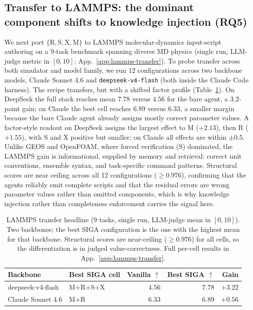 \documentclass{article}
\begin{document}
\subsection{Transfer to LAMMPS: the dominant component shifts to knowledge injection (RQ5)}
\label{subsec:lammps-transfer}

We next port $\{\mathrm{R,S,X,M}\}$ to LAMMPS molecular-dynamics input-script authoring on a 9-task benchmark spanning diverse MD physics (single run, LLM-judge metric in $[0,10]$; App.~\ref{app:lammps-transfer}). To probe transfer across both simulator and model family, we run 12 configurations across two backbone models, Claude Sonnet 4.6 and \texttt{deepseek-v4-flash} (both inside the Claude Code harness). The recipe transfers, but with a shifted factor profile (Table~\ref{tab:lammps-headline}). On DeepSeek the full stack reaches mean $7.78$ versus $4.56$ for the bare agent, a $3.2$-point gain; on Claude the best cell reaches $6.89$ versus $6.33$, a smaller margin because the bare Claude agent already assigns mostly correct parameter values. A factor-style readout on DeepSeek assigns the largest effect to $\mathrm{M}$ ($+2.13$), then $\mathrm{R}$ ($+1.55$), with $\mathrm{S}$ and $\mathrm{X}$ positive but smaller; on Claude all effects are within $\pm 0.5$. Unlike GEOS and OpenFOAM, where forced verification ($\mathrm{S}$) dominated, the LAMMPS gain is informational, supplied by memory and retrieval: correct unit conventions, ensemble syntax, and task-specific command patterns. Structural scores are near ceiling across all 12 configurations ($\geq 0.976$), confirming that the agents reliably emit complete scripts and that the residual errors are wrong parameter values rather than omitted components, which is why knowledge injection rather than completeness enforcement carries the signal here.

\begin{table}[t]
  \caption{LAMMPS transfer headline (9 tasks, single run, LLM-judge mean in $[0,10]$). Two backbones; the best SIGA configuration is the one with the highest mean for that backbone. Structural scores are near-ceiling ($\geq 0.976$) for all cells, so the differentiation is in judged value-correctness. Full per-cell results in App.~\ref{app:lammps-transfer}.}
  \label{tab:lammps-headline}
  \centering
  \small
  \begin{tabular}{llrrr}
    \toprule
    \textbf{Backbone} & \textbf{Best SIGA cell} & \textbf{Vanilla} $\uparrow$ & \textbf{Best SIGA} $\uparrow$ & \textbf{Gain} \\
    \midrule
    deepseek-v4-flash & M$+$R$+$S$+$X & $4.56$ & $\mathbf{7.78}$ & $+3.22$ \\
    Claude Sonnet 4.6 & M$+$R         & $6.33$ & $6.89$          & $+0.56$ \\
    \bottomrule
  \end{tabular}
\end{table}
\end{document}
